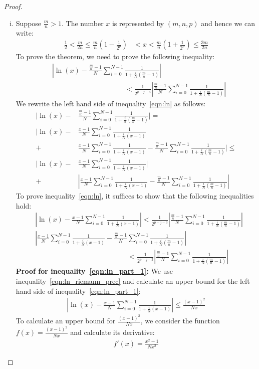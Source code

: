 \documentclass{article}
\numberwithin{mytheorem}{section}
\newcommand{\lnsumu}[2] {\frac{#1-1}{#2} \sum_{i=0}^{#2-1}\frac{1}{1+\frac{i}{#2}(#1-1)}}
\begin{document}
\begin{proof}
\textit{\\}
\begin{enumerate}[i.]
\item
Suppose $\frac{m}{n}>1$. The number $x$ is represented by $(m,n,p)$ and hence we can write:
\begin{align}
\frac{1}{2}<\frac{m}{2n}\leq \frac{m}{n}(1-\frac{1}{2^p})&<x<\frac{m}{n}(1+\frac{1}{2^p})\leq \frac{3m}{2n} \label{eqn:ln_x_bound}
\end{align}
To prove the theorem, we need to prove the following inequality:
\begin{align}
&|\ln(x)-\lnsumu{\frac{m}{n}}{N}|\nonumber\\
&\phantom{|\ln(x)-\frac{\frac{m}{n}-1}{N}\sum_{i=0}^{N-1}}<\frac{1}{2^{p-j-4}}|\lnsumu{\frac{m}{n}}{N}|\label{eqn:ln}
\end{align}
We rewrite the left hand side of inequality~\eqref{eqn:ln} as follows:
\begin{align*}
|\ln(x)-&\lnsumu{\frac{m}{n}}{N}|=\\
|\ln(x)-&\lnsumu{x}{N}\\
+&\lnsumu{x}{N}-\lnsumu{\frac{m}{n}}{N}|\leq \\
|\ln(x)-&\lnsumu{x}{N}|\\
+&|\lnsumu{x}{N}-\lnsumu{\frac{m}{n}}{N}|
\end{align*}
To prove inequality~\eqref{eqn:ln}, it suffices to show that the following inequalities hold:
\begin{align}
&|\ln(x)-\lnsumu{x}{N}|<\frac{1}{2^{p-j-3}}|\lnsumu{\frac{m}{n}}{N}|\label{eqn:ln_part_1} \\
&|\lnsumu{x}{N}-\lnsumu{\frac{m}{n}}{N}|\nonumber\\
&\phantom{|\lnsumu{x}{N}-\frac{\frac{m}{n}-1}{N}}<\frac{1}{2^{p-j-3}}|\lnsumu{\frac{m}{n}}{N}|\label{eqn:ln_part_2}
\end{align}
\textbf{Proof for inequality~\eqref{eqn:ln_part_1}:} 
We use inequality~\eqref{eqn:ln_riemann_prec} and calculate an upper bound for the left hand side of inequality~\eqref{eqn:ln_part_1}:
\begin{align}
|\ln(x)-\lnsumu{x}{N}|\leq \frac{(x-1)^2}{Nx}\label{eqn:ln_part_1_upper}
\end{align}
To calculate an upper bound for $\frac{(x-1)^2}{Nx}$, we consider the function $f(x)=\frac{(x-1)^2}{Nx}$ and calculate its derivative:
\begin{align*}
f'(x)=\frac{x^2-1}{Nx^2}
\end{align*}

\end{enumerate}
\end{proof}
\end{document}
